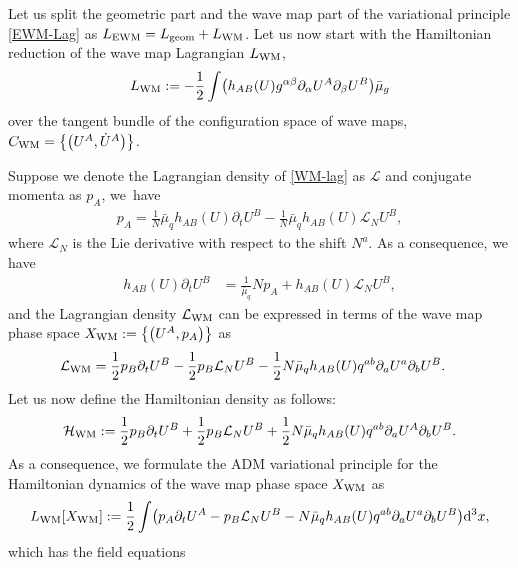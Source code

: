 \documentclass[11pt]{article}
\numberwithin{equation}{section}
\def\ptl{\partial}%
\def\mbo#1{\boldsymbol{#1}}%
\def\halb{\frac{1}{2}}%
\def \a{\alpha}
\def \b {\beta}
\renewcommand{\a}{\alpha}
\renewcommand{\b}{\beta}
\numberwithin{equation}{section}
\begin{document}
 Let us split the geometric part and the wave map part of the variational principle \eqref{EWM-Lag} as $L_{{\rm EWM}} = L_{{\rm geom}} + L_{{\rm WM}}$. %
 Let us now start with the Hamiltonian reduction of the wave map Lagrangian $L_{{\rm WM}}$,
 \begin{align}\label{WM-lag}
L_{{\rm WM}} := -\halb\int \bigl(h_{AB} (U) g^{\a \b} \ptl_\a U^A \ptl_\b U^B\bigr) \bar{\mu}_g
\end{align}
 over the tangent bundle of the configuration space of wave maps, $C_{{\rm WM}} = \bigl\{ \bigl(U^A, \dot{U}^A\bigr) \bigr\}$.


Suppose we denote the Lagrangian density of \eqref{WM-lag} as $\mathcal{L}$ and conjugate momenta as $p_A$, we~have
\begin{align*}
p_A = \frac{1}{N} \bar{\mu}_q h_{AB}(U) \ptl_t U^B - \frac{1}{N} \bar{\mu}_q h_{AB} (U) \mathcal{L}_N U^B,
\end{align*}
where $\mathcal{L}_N$ is the Lie derivative with respect to the shift $N^a$. As a consequence, we have
\begin{align*}
h_{AB} (U)\ptl_t U^B &{}= \frac{1}{\bar{\mu}_q} N p_A + h_{AB} (U) \mathcal{L}_N U^B,
\end{align*}
and the Lagrangian density $\mathcal{L}_{{\rm WM}}$ can be expressed in terms of the wave map phase space $X_{{\rm WM}} := \bigl\{ \bigl(U^A, p_A\bigr) \bigr\}$ as
\begin{align*}
\mathcal{L}_{{\rm WM}} &{}= \halb p_B \ptl_t U^B - \halb p_B \mathcal{L}_N U^B - \halb N \bar{\mu}_q h_{AB} (U) q^{ab} \ptl_a U^a \ptl_b U^B.
\end{align*}
Let us now define the Hamiltonian density as follows:
\begin{align*}
\mathcal{H}_{{\rm WM}} := \halb p_B \ptl_t U^B + \halb p_B \mathcal{L}_N U^B + \halb N \bar{\mu}_q h_{AB} (U) q^{ab} \ptl_a U^A \ptl_b U^B.
\end{align*}
As a consequence, we formulate the ADM variational principle for the Hamiltonian dynamics of the wave map phase space $X_{{\rm WM}}$ as
\begin{align*}
L_{{\rm WM}} [X_{{\rm WM}}] := \halb \int \bigl(p_A \ptl_t U^A - p_B \mathcal{L}_N U^B - N \bar{\mu}_q h_{AB} (U) q^{ab} \ptl_a U^a \ptl_b U^B\bigr){\rm d}^3x,
\end{align*}
which has the field equations
\end{document}
